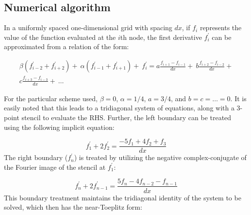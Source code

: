 \documentclass{elsarticle}
\begin{document}
\subsection{Numerical algorithm}

In a uniformly spaced one-dimensional grid with spacing $dx$,
if $f_i$ represents the value of
the function evaluated at the $i$th node,
the first derivative $f^{\prime}_i$ can be approximated from
a relation of the form:

\begin{equation}
\begin{split}
    \beta(f^{\prime}_{i-2} + f^{\prime}_{i+2}) + \
    \alpha(f^{\prime}_{i-1} + f^{\prime}_{i+1}) + \
        f^{\prime}_i
    = 
    a\frac{f_{i+1} - f_{i-1}}{dx} + \
    b\frac{f_{i+2} - f_{i-2}}{dx} + \\
    c\frac{f_{i+3} - f_{i-3}}{dx} + \
    \hdots
\end{split}
\label{eqn:general-compact}
\end{equation}

For the particular scheme used, $\beta=0$, $\alpha = 1/4$,
$a = 3/4$, and $b = c = \hdots = 0$.
It is easily noted that this leads to a tridiagonal system of equations,
along with a 3-point stencil to evaluate the RHS.
Further, the left boundary can be treated using the following implicit equation:

\begin{equation}
    f^{\prime}_1 + 2f^{\prime}_2 = \frac{-5f_1 + 4f_2 + f_3}{dx}
\end{equation}
%
The right boundary ($f^{\prime}_{n}$) is treated by utilizing
the negative complex-conjugate of the Fourier image of the stencil
at $f^{\prime}_1$:

\begin{equation}
    f^{\prime}_{n} + 2f^{\prime}_{n-1}
    =
    \frac{5f_{n} - 4f_{n-2} -  f_{n-1}}{dx}
\end{equation}
%
This boundary treatment maintains the tridiagonal identity
of the system to be solved, which then has the near-Toeplitz form:
\end{document}
